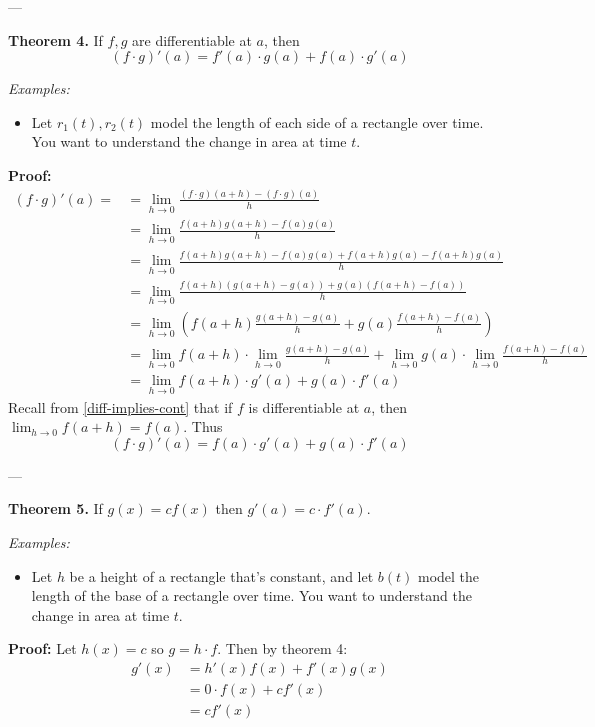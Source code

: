 ---\vs

\textbf{Theorem 4.} If $f,g$ are differentiable at $a$, then
\[(f\cdot g)'(a)=f'(a)\cdot g(a)+f(a)\cdot g'(a)\]

\vs

\textit{Examples:}
\begin{itemize}
\item Let $r_1(t), r_2(t)$ model the length of each side of a
  rectangle over time. You want to understand the change in area at
  time $t$.
\end{itemize}

\textbf{Proof:}
\begin{align*}
(f\cdot g)'(a)=&=\lim_{h\to0}\frac{(f\cdot g)(a+h)-(f\cdot g)(a)}{h}\\
           &=\lim_{h\to0}\frac{f(a+h)g(a+h)-f(a)g(a)}{h}\\
           &=\lim_{h\to0}\frac{f(a+h)g(a+h)-f(a)g(a) + f(a+h)g(a)-f(a+h)g(a)}{h}\\
           &=\lim_{h\to0}\frac{f(a+h)(g(a+h)-g(a)) + g(a)(f(a+h) - f(a))}{h}\\
           &=\lim_{h\to0}\left(f(a+h)\frac{g(a+h)-g(a)}{h}+g(a)\frac{f(a+h)-f(a)}{h}\right)\\
           &=\lim_{h\to0}f(a+h)\cdot\lim_{h\to0}\frac{g(a+h)-g(a)}{h}+\lim_{h\to0}g(a)\cdot\lim_{h\to0}\frac{f(a+h)-f(a)}{h}\\
           &=\lim_{h\to0}f(a+h)\cdot g'(a)+g(a)\cdot f'(a)
\end{align*}
Recall from \ref{diff-implies-cont} that if $f$ is differentiable at
$a$, then $\lim_{h\to0}f(a+h)=f(a)$. Thus
\[(f\cdot g)'(a)=f(a)\cdot g'(a)+g(a)\cdot f'(a)\]

---\vs

\textbf{Theorem 5.} If $g(x)=cf(x)$ then $g'(a)=c\cdot f'(a)$.

\vs

\textit{Examples:}
\begin{itemize}
\item Let $h$ be a height of a rectangle that's constant, and let
  $b(t)$ model the length of the base of a rectangle over time. You
  want to understand the change in area at time $t$.
\end{itemize}

\textbf{Proof:} Let $h(x)=c$ so $g=h\cdot f$. Then by theorem 4:
\begin{align*}
  g'(x)&=h'(x)f(x)+f'(x)g(x)\\
       &=0\cdot f(x)+cf'(x)\\
       &=cf'(x)
\end{align*}


